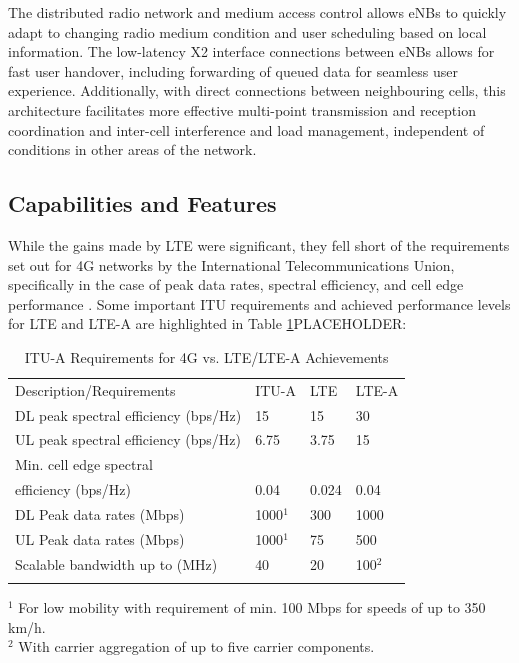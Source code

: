 The distributed radio network and medium access control allows eNBs to quickly adapt to changing radio medium condition and user scheduling based on local information.  The low-latency X2 interface connections between eNBs allows for fast user handover, including forwarding of queued data for seamless user experience.  Additionally, with direct connections between neighbouring cells, this architecture facilitates more effective multi-point transmission and reception coordination and inter-cell interference and load management, independent of conditions in other areas of the network.  

\subsection{Capabilities and Features}

While the gains made by LTE were significant, they fell short of the requirements set out for 4G networks by the International Telecommunications Union, specifically in the case of peak data rates, spectral efficiency, and cell edge performance \cite{itu-advanced}. Some important ITU requirements and achieved performance levels for LTE and LTE-A are highlighted in Table \ref{perf-table}PLACEHOLDER:

\begin{table}
	\caption{ITU-A Requirements for 4G vs. LTE/LTE-A Achievements \cite{lte-3gpp}\cite{lteA-3gpp}\cite{itu-advanced}\cite{abdullah}}
	\label{perf-table}      
	\begin{tabular}{p{4.8cm}p{2.4cm}p{2.4cm}p{2.4cm}}
		\hline\noalign{\smallskip}
		Description/Requirements & ITU-A & LTE & LTE-A   \\
		\noalign{\smallskip}\svhline\noalign{\smallskip}
		DL peak spectral efficiency (bps/Hz) &  15   & 15  & 30 \\
		UL peak spectral efficiency (bps/Hz)& 6.75  & 3.75  & 15 \\
		Min. cell edge spectral \\ \hspace{0.8em} efficiency (bps/Hz) & 0.04 & 0.024 & 0.04 \\
		DL Peak data rates (Mbps) & 1000$^1$  & 300 & 1000 \\
		UL Peak data rates (Mbps) & 1000$^1$  & 75 & 500 \\
		Scalable bandwidth up to (MHz) & 40 & 20  & 100$^2$ \\
		
		\noalign{\smallskip}\hline\noalign{\smallskip}
	\end{tabular}
	$^1$ For low mobility with requirement of min. 100 Mbps for speeds of up to 350 km/h. 	 \\
	$^2$ With carrier aggregation of up to five carrier components.
\end{table}

